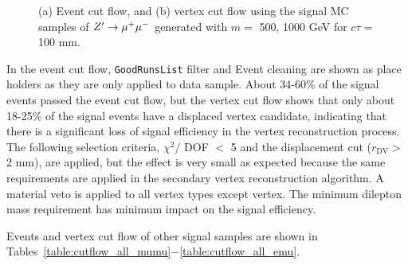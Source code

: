 \begin{figure}[!htb]
    \centering
    \caption{(a) Event cut flow, and (b) vertex cut flow using the signal MC samples of $Z'\rightarrow \mu^{+}\mu^{-}$ generated with $m =$ 500, 1000 GeV for $c\tau= $ 100 mm.}
    \label{fig:signal_cutflow_MC_mumu}
\end{figure}

In the event cut flow, \texttt{GoodRunsList} filter and Event cleaning are shown as place holders as they are only applied to data sample. About 34-60$\%$ of the signal events passed the event cut flow, but the vertex cut flow shows that only about 18-25$\%$ of the signal events have a displaced vertex candidate, indicating that there is a significant loss of signal efficiency in the vertex reconstruction process. The following selection criteria, $\chi^{2} /$ DOF $<$ 5 and the displacement cut ($r_{\mathrm{DV}} > $ 2 mm), are applied, but the effect is very small as expected because the same requirements are applied in the secondary vertex reconstruction algorithm. A material veto is applied to all vertex types except \mumu vertex. The minimum dilepton mass requirement has minimum impact on the signal efficiency.

Events and vertex cut flow of other signal samples are shown in Tables~\ref{table:cutflow_all_mumu}$-$\ref{table:cutflow_all_emu}.


